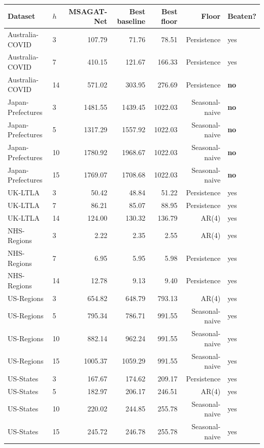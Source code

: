 \begin{tabular}{llrrrrl}
\hline
Dataset & $h$ & MSAGAT-Net & Best baseline & Best floor & Floor & Beaten? \\
\hline
Australia-COVID & 3 & 107.79 & 71.76 & 78.51 & Persistence & yes \\
Australia-COVID & 7 & 410.15 & 121.67 & 166.33 & Persistence & yes \\
Australia-COVID & 14 & 571.02 & 303.95 & 276.69 & Persistence & \textbf{no} \\
Japan-Prefectures & 3 & 1481.55 & 1439.45 & 1022.03 & Seasonal-naive & \textbf{no} \\
Japan-Prefectures & 5 & 1317.29 & 1557.92 & 1022.03 & Seasonal-naive & \textbf{no} \\
Japan-Prefectures & 10 & 1780.92 & 1968.67 & 1022.03 & Seasonal-naive & \textbf{no} \\
Japan-Prefectures & 15 & 1769.07 & 1708.68 & 1022.03 & Seasonal-naive & \textbf{no} \\
UK-LTLA & 3 & 50.42 & 48.84 & 51.22 & Persistence & yes \\
UK-LTLA & 7 & 86.21 & 85.07 & 88.95 & Persistence & yes \\
UK-LTLA & 14 & 124.00 & 130.32 & 136.79 & AR(4) & yes \\
NHS-Regions & 3 & 2.22 & 2.35 & 2.55 & AR(4) & yes \\
NHS-Regions & 7 & 6.95 & 5.95 & 5.98 & Persistence & yes \\
NHS-Regions & 14 & 12.78 & 9.13 & 9.40 & Persistence & yes \\
US-Regions & 3 & 654.82 & 648.79 & 793.13 & AR(4) & yes \\
US-Regions & 5 & 795.34 & 786.71 & 991.55 & Seasonal-naive & yes \\
US-Regions & 10 & 882.14 & 962.24 & 991.55 & Seasonal-naive & yes \\
US-Regions & 15 & 1005.37 & 1059.29 & 991.55 & Seasonal-naive & yes \\
US-States & 3 & 167.67 & 174.62 & 209.17 & Persistence & yes \\
US-States & 5 & 182.97 & 206.17 & 246.51 & AR(4) & yes \\
US-States & 10 & 220.02 & 244.85 & 255.78 & Seasonal-naive & yes \\
US-States & 15 & 245.72 & 246.78 & 255.78 & Seasonal-naive & yes \\
\hline
\end{tabular}
